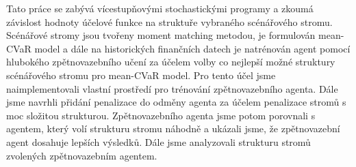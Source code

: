 \documentclass[12pt]{report}
\begin{document}

Tato práce se zabývá vícestupňovými stochastickými programy a zkoumá závislost hodnoty účelové funkce na struktuře vybraného scénářového stromu. Scénářové stromy jsou tvořeny moment matching metodou, je formulován mean-CVaR model a dále na historických finančních datech je natrénován agent pomocí hlubokého zpětnovazebního učení za účelem volby co nejlepší možné struktury scénářového stromu pro mean-CVaR model. Pro tento účel jsme naimplementovali vlastní prostředí pro trénování zpětnovazebního agenta. Dále jsme navrhli přidání penalizace do odměny agenta za účelem penalizace stromů s moc složitou strukturou. Zpětnovazebního agenta jsme potom porovnali s agentem, který volí strukturu stromu náhodně a ukázali jsme, že zpětnovazební agent dosahuje lepších výsledků. Dále jsme analyzovali strukturu stromů zvolených zpětnovazebním agentem.
\end{document}
